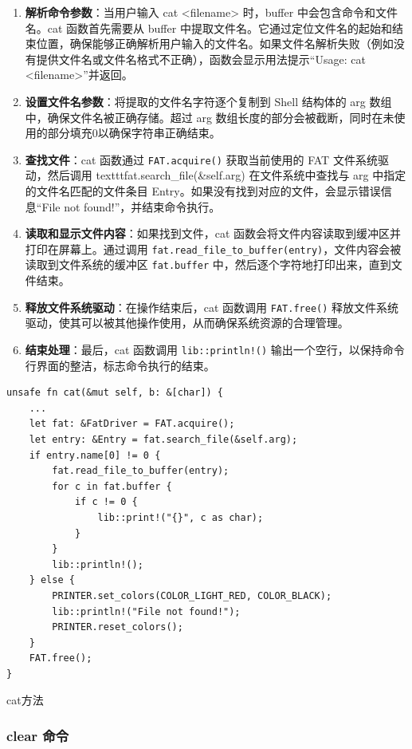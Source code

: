 \begin{enumerate}
    \item \textbf{解析命令参数}：当用户输入 cat <filename> 时，buffer 中会包含命令和文件名。cat 函数首先需要从 buffer 中提取文件名。它通过定位文件名的起始和结束位置，确保能够正确解析用户输入的文件名。如果文件名解析失败（例如没有提供文件名或文件名格式不正确），函数会显示用法提示“Usage: cat <filename>”并返回。
    \item \textbf{设置文件名参数}：将提取的文件名字符逐个复制到 Shell 结构体的 arg 数组中，确保文件名被正确存储。超过 arg 数组长度的部分会被截断，同时在未使用的部分填充0以确保字符串正确结束。
    \item \textbf{查找文件}：cat 函数通过 \texttt{FAT.acquire()} 获取当前使用的 FAT 文件系统驱动，然后调用 texttt{fat.search\_file(\&self.arg)} 在文件系统中查找与 arg 中指定的文件名匹配的文件条目 Entry。如果没有找到对应的文件，会显示错误信息“File not found!”，并结束命令执行。
    \item \textbf{读取和显示文件内容}：如果找到文件，cat 函数会将文件内容读取到缓冲区并打印在屏幕上。通过调用 \texttt{fat.read\_file\_to\_buffer(entry)}，文件内容会被读取到文件系统的缓冲区 \texttt{fat.buffer} 中，然后逐个字符地打印出来，直到文件结束。
    \item \textbf{释放文件系统驱动}：在操作结束后，cat 函数调用 \texttt{FAT.free()} 释放文件系统驱动，使其可以被其他操作使用，从而确保系统资源的合理管理。
    \item \textbf{结束处理}：最后，cat 函数调用 \texttt{lib::println!()} 输出一个空行，以保持命令行界面的整洁，标志命令执行的结束。
\end{enumerate}

\begin{listing}[htbp]
    \begin{verbatim}
unsafe fn cat(&mut self, b: &[char]) {
    ...
    let fat: &FatDriver = FAT.acquire();
    let entry: &Entry = fat.search_file(&self.arg);
    if entry.name[0] != 0 {
        fat.read_file_to_buffer(entry);
        for c in fat.buffer {
            if c != 0 {
                lib::print!("{}", c as char);
            }
        }
        lib::println!();
    } else {
        PRINTER.set_colors(COLOR_LIGHT_RED, COLOR_BLACK);
        lib::println!("File not found!");
        PRINTER.reset_colors();
    }
    FAT.free();
}
    \end{verbatim}
    \caption{cat方法}\label{lst:CatMethod}
\end{listing}

\subsubsection{clear 命令}

